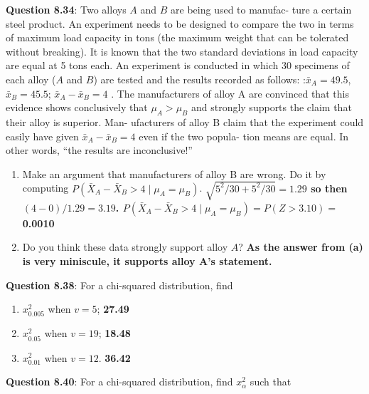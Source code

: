 \documentclass{article}
\begin{document}
    \textbf{Question 8.34}: Two alloys $A$ and $B$ are being used to manufac-
    ture a certain steel product. An experiment needs to
    be designed to compare the two in terms of maximum
    load capacity in tons (the maximum weight that can
    be tolerated without breaking). It is known that the
    two standard deviations in load capacity are equal at
    5 tons each. An experiment is conducted in which 30
    specimens of each alloy ($A$ and $B$) are tested and the
    results recorded as follows:\newline
    :\hfill $\bar{x}_A = 49.5$, \hfill $\bar{x}_B=45.5$; \hfill $\bar{x}_A-\bar{x}_B = 4$ \hfill.\newline
    The manufacturers of alloy A are convinced that this
    evidence shows conclusively that $\mu_A > \mu_B$ and strongly
    supports the claim that their alloy is superior. Man-
    ufacturers of alloy B claim that the experiment could
    easily have given $\bar{x}_A - \bar{x}_B = 4$ even if the two popula-
    tion means are equal. In other words, “the results are
    inconclusive!”
    \begin{enumerate}[label = (\alph*) ]
        \item Make an argument that manufacturers of alloy B
        are wrong. Do it by computing $P(\bar{X}_A-\bar{X}_B>4 \mid \mu_A = \mu_B)$.\newline
            \textbf{$\sqrt{5^2/30 + 5^2/30} = 1.29$ so then $(4-0)/1.29=3.19$. 
            $P(\bar{X}_A-\bar{X}_B>4 \mid \mu_A = \mu_B) = P(Z>3.10)=$ 0.0010}
        \item Do you think these data strongly support alloy $A$?\newline
            \textbf{As the answer from (a) is very miniscule, it supports alloy A's statement.}
    \end{enumerate}
    \textbf{Question 8.38}: For a chi-squared distribution, find
        \begin{enumerate}[label = (\alph*) ]
            \item $x_{0.005}^{2}$ when $v = 5$;\newline
                \textbf{27.49}
            \item $x_{0.05}^{2}$ when $v = 19$;\newline
                \textbf{18.48}
            \item $x_{0.01}^{2}$ when $v = 12$.\newline
                \textbf{36.42}
        \end{enumerate}
    \textbf{Question 8.40}: For a chi-squared distribution, find $x^{2}_{\alpha}$ such that
\end{document}
